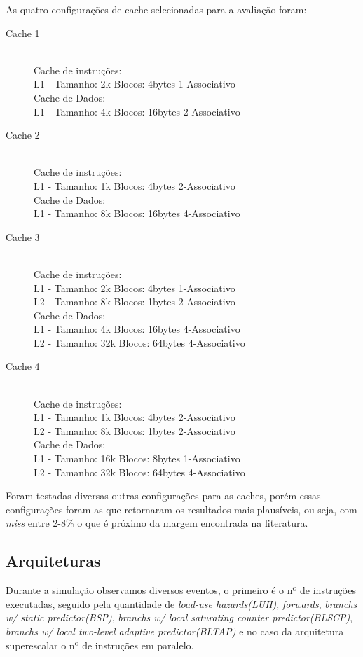 \documentclass[pdftex,12pt,a4paper]{article}
\begin{document}
As quatro configurações de cache selecionadas para a avaliação foram:

\begin{description}
\item[Cache 1] \hfill \\
Cache de instruções:\\
L1 - Tamanho: 2k Blocos: 4bytes 1-Associativo\\
Cache de Dados:\\
L1 - Tamanho: 4k Blocos: 16bytes 2-Associativo
\item[Cache 2] \hfill \\
Cache de instruções:\\
L1 - Tamanho: 1k Blocos: 4bytes 2-Associativo\\
Cache de Dados:\\
L1 - Tamanho: 8k Blocos: 16bytes 4-Associativo
\item[Cache 3] \hfill \\
Cache de instruções:\\
L1 - Tamanho: 2k Blocos: 4bytes 1-Associativo\\
L2 - Tamanho: 8k Blocos: 1bytes 2-Associativo\\
Cache de Dados:\\
L1 - Tamanho: 4k Blocos: 16bytes 4-Associativo\\
L2 - Tamanho: 32k Blocos: 64bytes 4-Associativo
\item[Cache 4] \hfill \\
Cache de instruções:\\
L1 - Tamanho: 1k Blocos: 4bytes 2-Associativo\\
L2 - Tamanho: 8k Blocos: 1bytes 2-Associativo\\
Cache de Dados:\\
L1 - Tamanho: 16k Blocos: 8bytes 1-Associativo\\
L2 - Tamanho: 32k Blocos: 64bytes 4-Associativo
\end{description}

Foram testadas diversas outras configurações para as caches, porém essas configurações foram as que 
retornaram os resultados mais plausíveis, ou seja, com \textit{miss} entre 2-8\% o que é próximo da margem 
encontrada na literatura.

\subsection{Arquiteturas}

Durante a simulação observamos diversos eventos, o primeiro é o nº de instruções executadas, seguido pela 
quantidade de \textit{load-use hazards(LUH)}, \textit{forwards}, \textit{branchs w/ static predictor(BSP)}, 
\textit{branchs w/ local saturating counter predictor(BLSCP)}, \textit{branchs w/ local two-level adaptive 
predictor(BLTAP)} e no caso da arquitetura superescalar o nº de instruções em paralelo.
\end{document}
